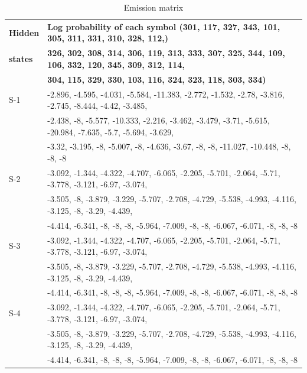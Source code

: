 \documentclass{amia}
\begin{document}
\begin{table}[h]
\centering
\caption{Emission matrix}
\label{tab:emission_matrix}
  \begin{tabular}{|l|l|}
  \hline
   \textbf{Hidden} & \textbf{Log probability of each symbol (301, 117, 327, 343, 101, 305, 311, 331, 310, 328, 112,)} \\ 
   \textbf{states} & \textbf{ 326, 302, 308, 314, 306, 119, 313, 333, 307, 325, 344, 109, 106, 332, 120, 345, 309, 312, 114,} \\
    & \textbf{ 304, 115, 329, 330, 103, 116, 324, 323, 118, 303, 334)} \\\hline      
S-1 & -2.896, -4.595, -4.031, -5.584, -11.383, -2.772, -1.532, -2.78, -3.816, -2.745, -8.444, -4.42, -3.485, \\
& -2.438, -8, -5.577, -10.333, -2.216, -3.462, -3.479, -3.71, -5.615, -20.984, -7.635, -5.7, -5.694, -3.629, \\
& -3.32, -3.195, -8, -5.007, -8, -4.636, -3.67, -8, -8, -11.027, -10.448, -8, -8, -8 \\\hline
S-2 & -3.092, -1.344, -4.322, -4.707, -6.065, -2.205, -5.701, -2.064, -5.71, -3.778, -3.121, -6.97, -3.074, \\
& -3.505, -8, -3.879, -3.229, -5.707, -2.708, -4.729, -5.538, -4.993, -4.116, -3.125, -8, -3.29, -4.439, \\
& -4.414, -6.341, -8, -8, -8, -5.964, -7.009, -8, -8, -6.067, -6.071, -8, -8, -8 \\\hline
S-3 & -3.092, -1.344, -4.322, -4.707, -6.065, -2.205, -5.701, -2.064, -5.71, -3.778, -3.121, -6.97, -3.074, \\
& -3.505, -8, -3.879, -3.229, -5.707, -2.708, -4.729, -5.538, -4.993, -4.116, -3.125, -8, -3.29, -4.439, \\
& -4.414, -6.341, -8, -8, -8, -5.964, -7.009, -8, -8, -6.067, -6.071, -8, -8, -8 \\\hline
S-4 & -3.092, -1.344, -4.322, -4.707, -6.065, -2.205, -5.701, -2.064, -5.71, -3.778, -3.121, -6.97, -3.074, \\
& -3.505, -8, -3.879, -3.229, -5.707, -2.708, -4.729, -5.538, -4.993, -4.116, -3.125, -8, -3.29, -4.439, \\
& -4.414, -6.341, -8, -8, -8, -5.964, -7.009, -8, -8, -6.067, -6.071, -8, -8, -8 \\\hline


\end{tabular}
\end{table}
\end{document}
